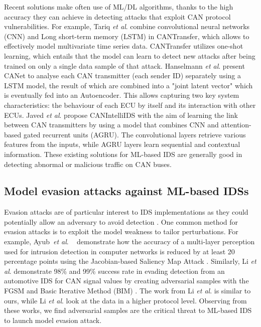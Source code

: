 \documentclass[conference]{IEEEtran}
\newcommand{\etal}{\textit{et al}. }
\begin{document}
Recent solutions make often use of ML/DL algorithms, thanks to the high accuracy they can achieve in detecting attacks that exploit CAN protocol vulnerabilities.
%
For example, Tariq \etal \cite{CANTransfer_2020} combine convolutional neural networks (CNN) and Long short-term memory (LSTM) in CANTransfer, which allows to effectively model multivariate time series data. CANTransfer utilizes one-shot learning, which entails that the model can learn to detect new attacks after being trained on only a single data sample of that attack. Hanselmann \etal \cite{CANet_2020} present CANet to analyse each CAN transmitter (each sender ID) separately using a LSTM model, the result of which are combined into a "joint latent vector" which is eventually fed into an Autoencoder. This allows capturing two key system characteristics: the behaviour of each ECU by itself and its interaction with other ECUs. Javed \etal \cite{CANIntelliIDS_2021} propose CANIntelliIDS with the aim of learning the link between CAN transmitters by using a model that combines CNN and attention-based gated recurrent units (AGRU). The convolutional layers retrieve various features from the inputs, while AGRU layers learn sequential and contextual information. These existing solutions for ML-based IDS are generally good in detecting abnormal or malicious traffic on CAN buses.
%




\subsection{Model evasion attacks against ML-based IDSs}

Evasion attacks are of particular interest to IDS implementations as they could potentially allow an adversary to avoid detection \cite{Adversarial_Attacks_Against_Intrusion_Detction_Systems_Taxonomy_2013}. One common method for evasion attacks is to exploit the model weakness to tailor perturbations. For example, Ayub~\etal~\cite{Model_Evasion_Attack_IDS_Adversarial_ML_2020} demonstrate how the accuracy of a multi-layer perception used for intrusion detection in computer networks is reduced by at least 20 percentage points using the Jacobian-based Saliency Map Attack . Similarly, Li \etal \cite{Adversarial_Attack_Defending_System_Securing_Vehicle_Network_2021} demonstrate 98\% and 99\% success rate in evading detection from an automotive IDS for CAN signal values by creating adversarial samples with the FGSM and  Basic Iterative Method (BIM) \cite{Adversarial_Attack_Defending_System_Securing_Vehicle_Network_2021}. The work from Li \etal is similar to ours, while Li \etal look at the data in a higher protocol level. Observing from these works, we find adversarial samples are the critical threat to ML-based IDS to launch model evasion attack.
\end{document}
